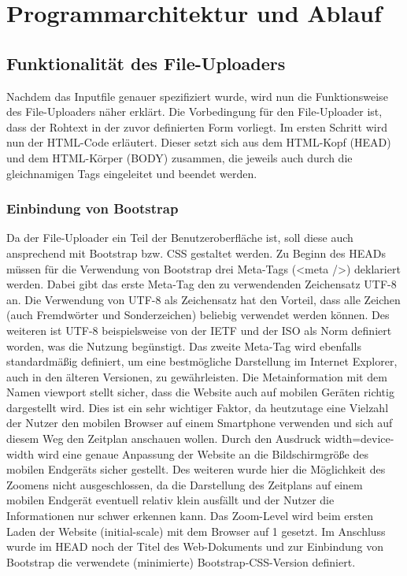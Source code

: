 {\section{Programmarchitektur und Ablauf}
\subsection{Funktionalität des File-Uploaders}
Nachdem das Inputfile genauer spezifiziert wurde, wird nun die Funktionsweise des File-Uploaders näher erklärt. Die Vorbedingung für den File-Uploader ist, dass der Rohtext in der zuvor definierten Form vorliegt.
Im ersten Schritt wird nun der HTML-Code erläutert. Dieser setzt sich aus dem HTML-Kopf (HEAD) und dem HTML-Körper (BODY) zusammen, die jeweils auch durch die gleichnamigen Tags eingeleitet und beendet werden. 

\subsubsection{Einbindung von Bootstrap}
Da der File-Uploader ein Teil der Benutzeroberfläche ist, soll diese auch ansprechend mit Bootstrap bzw. CSS gestaltet werden. Zu Beginn des HEADs müssen für die Verwendung von Bootstrap drei Meta-Tags (<meta />) deklariert werden. 
Dabei gibt das erste Meta-Tag den zu verwendenden Zeichensatz \ac{UTF-8} an. Die Verwendung von UTF-8 als Zeichensatz hat den Vorteil, dass alle Zeichen (auch Fremdwörter und Sonderzeichen) beliebig verwendet werden können. Des weiteren ist UTF-8 beispielsweise von der \ac{IETF} und der \ac{ISO} als Norm definiert worden, was die Nutzung begünstigt. 
Das zweite Meta-Tag wird ebenfalls standardmäßig definiert, um eine bestmögliche Darstellung im Internet Explorer, auch in den älteren Versionen, zu gewährleisten. 
Die Metainformation mit dem Namen viewport stellt sicher, dass die Website auch auf mobilen Geräten richtig dargestellt wird. Dies ist ein sehr wichtiger Faktor, da heutzutage eine Vielzahl der Nutzer den mobilen Browser auf einem Smartphone verwenden und sich auf diesem Weg den Zeitplan anschauen wollen. Durch den Ausdruck width=device-width wird eine genaue Anpassung der Website an die Bildschirmgröße des mobilen Endgeräts sicher gestellt. Des weiteren wurde hier die Möglichkeit des Zoomens nicht ausgeschlossen, da die Darstellung des Zeitplans auf einem mobilen Endgerät eventuell relativ klein ausfällt und der Nutzer die Informationen nur schwer erkennen kann. Das Zoom-Level wird beim ersten Laden der Website (initial-scale) mit dem Browser auf 1 gesetzt. 
Im Anschluss wurde im HEAD noch der Titel des Web-Dokuments und zur Einbindung von Bootstrap die verwendete (minimierte) Bootstrap-CSS-Version definiert. 

}
